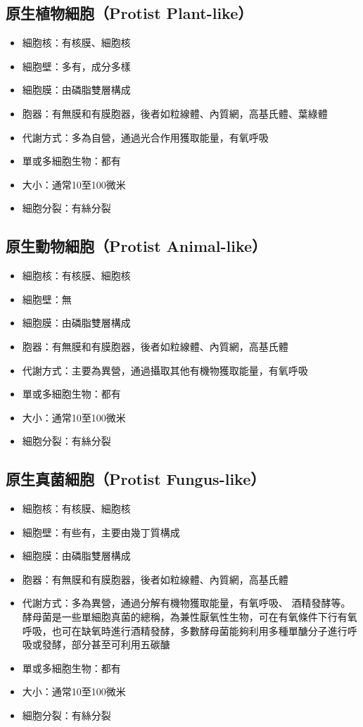 \documentclass[a4paper,12pt]{report}
\begin{document}
\subsection{原生植物細胞（Protist Plant-like）}
\begin{itemize}
  \item 細胞核：有核膜、細胞核
  \item 細胞壁：多有，成分多樣
  \item 細胞膜：由磷脂雙層構成
  \item 胞器：有無膜和有膜胞器，後者如粒線體、內質網，高基氏體、葉綠體
  \item 代謝方式：多為自營，通過光合作用獲取能量，有氧呼吸
  \item 單或多細胞生物：都有
  \item 大小：通常10至100微米
  \item 細胞分裂：有絲分裂
\end{itemize}
\subsection{原生動物細胞（Protist Animal-like）}
\begin{itemize}
  \item 細胞核：有核膜、細胞核
  \item 細胞壁：無
  \item 細胞膜：由磷脂雙層構成
  \item 胞器：有無膜和有膜胞器，後者如粒線體、內質網，高基氏體
  \item 代謝方式：主要為異營，通過攝取其他有機物獲取能量，有氧呼吸
  \item 單或多細胞生物：都有
  \item 大小：通常10至100微米
  \item 細胞分裂：有絲分裂
\end{itemize}
\subsection{原生真菌細胞（Protist Fungus-like）}
\begin{itemize}
  \item 細胞核：有核膜、細胞核
  \item 細胞壁：有些有，主要由幾丁質構成
  \item 細胞膜：由磷脂雙層構成
  \item 胞器：有無膜和有膜胞器，後者如粒線體、內質網，高基氏體
  \item 代謝方式：多為異營，通過分解有機物獲取能量，有氧呼吸、 酒精發酵等。酵母菌是一些單細胞真菌的總稱，為兼性厭氧性生物，可在有氧條件下行有氧呼吸，也可在缺氧時進行酒精發酵，多數酵母菌能夠利用多種單醣分子進行呼吸或發酵，部分甚至可利用五碳醣
  \item 單或多細胞生物：都有
  \item 大小：通常10至100微米
  \item 細胞分裂：有絲分裂
\end{itemize}
\end{document}
